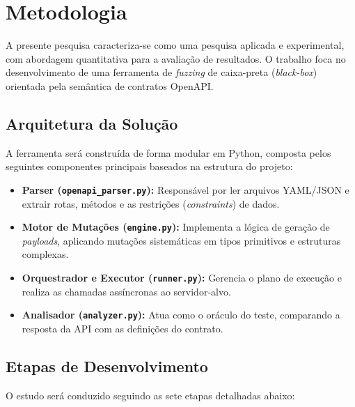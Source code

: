 \section{Metodologia}
A presente pesquisa caracteriza-se como uma pesquisa aplicada e experimental, com abordagem quantitativa para a avaliação de resultados. O trabalho foca no desenvolvimento de uma ferramenta de \textit{fuzzing} de caixa-preta (\textit{black-box}) orientada pela semântica de contratos OpenAPI.

\subsection{Arquitetura da Solução}
A ferramenta será construída de forma modular em Python, composta pelos seguintes componentes principais baseados na estrutura do projeto:
\begin{itemize}
    \item \textbf{Parser (\texttt{openapi\_parser.py}):} Responsável por ler arquivos YAML/JSON e extrair rotas, métodos e as restrições (\textit{constraints}) de dados.
    \item \textbf{Motor de Mutações (\texttt{engine.py}):} Implementa a lógica de geração de \textit{payloads}, aplicando mutações sistemáticas em tipos primitivos e estruturas complexas.
    \item \textbf{Orquestrador e Executor (\texttt{runner.py}):} Gerencia o plano de execução e realiza as chamadas assíncronas ao servidor-alvo.
    \item \textbf{Analisador (\texttt{analyzer.py}):} Atua como o oráculo do teste, comparando a resposta da API com as definições do contrato.
\end{itemize}

\subsection{Etapas de Desenvolvimento}
O estudo será conduzido seguindo as sete etapas detalhadas abaixo:

